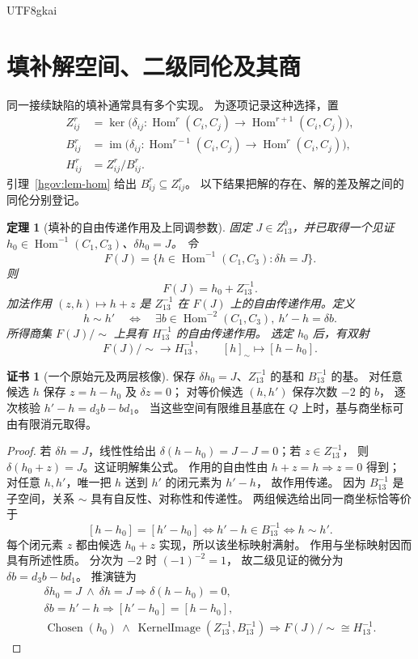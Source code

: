 \documentclass[12pt,a4paper,openany,notitlepage]{report}
\theoremstyle{plain}
\newtheorem{theorem}{定理}[chapter]
\theoremstyle{definition}
\newtheorem*{certificate}{证书}
\theoremstyle{remark}
\def\mathcal#1{#1}\def\mathsf#1{#1}\def\mathbb#1{#1}%
\begin{document}
\begin{CJK*}{UTF8}{gkai}
\section{填补解空间、二级同伦及其商}
\label{exp:hom:fill-space}

同一接续缺陷的填补通常具有多个实现。
为逐项记录这种选择，置
\[
 \begin{aligned}
 Z^r_{ij}
 &=\ker\bigl(\delta_{ij}:
       \operatorname{Hom}^r(C_i,C_j)\to
       \operatorname{Hom}^{r+1}(C_i,C_j)\bigr),\\
 B^r_{ij}
 &=\operatorname{im}\bigl(\delta_{ij}:
       \operatorname{Hom}^{r-1}(C_i,C_j)\to
       \operatorname{Hom}^{r}(C_i,C_j)\bigr),\\
 H^r_{ij}&=Z^r_{ij}/B^r_{ij}.
 \end{aligned}
\]
引理~\ref{hgov:lem-hom} 给出 $B^r_{ij}\subseteq Z^r_{ij}$。
以下结果把解的存在、解的差及解之间的同伦分别登记。

\begin{theorem}[填补的自由传递作用及上同调参数]
\label{exp:hom:filler-torsor}
固定 $J\in Z^0_{13}$，并已取得一个见证
$h_0\in\operatorname{Hom}^{-1}(C_1,C_3)$、$\delta h_0=J$。
令
\[
 \mathcal F(J)
 =\{h\in\operatorname{Hom}^{-1}(C_1,C_3):\delta h=J\}.
\]
则
\[
 \mathcal F(J)=h_0+Z^{-1}_{13}.
\]
加法作用 $(z,h)\mapsto h+z$ 是 $Z^{-1}_{13}$ 在
$\mathcal F(J)$ 上的自由传递作用。定义
\[
 h\sim h'
 \quad\Longleftrightarrow\quad
 \exists b\in\operatorname{Hom}^{-2}(C_1,C_3),\
 h'-h=\delta b.
\]
所得商集 $\mathcal F(J)/{\sim}$ 上具有 $H^{-1}_{13}$ 的自由传递作用。
选定 $h_0$ 后，有双射
\[
 \mathcal F(J)/{\sim}\longrightarrow H^{-1}_{13},
 \qquad [h]_{\sim}\longmapsto[h-h_0].
\]
\end{theorem}
\begin{certificate}[一个原始元及两层核像]
保存 $\delta h_0=J$、$Z^{-1}_{13}$ 的基和
$B^{-1}_{13}$ 的基。
对任意候选 $h$ 保存 $z=h-h_0$ 及 $\delta z=0$；
对等价候选 $(h,h')$ 保存次数 $-2$ 的 $b$，
逐次核验 $h'-h=d_3b-bd_1$。
当这些空间有限维且基底在 $\mathbb Q$ 上时，基与商坐标可由有限消元取得。
\end{certificate}
\begin{proof}
若 $\delta h=J$，线性性给出
$\delta(h-h_0)=J-J=0$；若 $z\in Z^{-1}_{13}$，
则 $\delta(h_0+z)=J$。这证明解集公式。
作用的自由性由 $h+z=h\Rightarrow z=0$ 得到；
对任意 $h,h'$，唯一把 $h$ 送到 $h'$ 的闭元素为 $h'-h$，
故作用传递。
因为 $B^{-1}_{13}$ 是子空间，关系 $\sim$ 具有自反性、对称性和传递性。
两组候选给出同一商坐标恰等价于
\[
 [h-h_0]=[h'-h_0]
 \Longleftrightarrow h'-h\in B^{-1}_{13}
 \Longleftrightarrow h\sim h'.
\]
每个闭元素 $z$ 都由候选 $h_0+z$ 实现，所以该坐标映射满射。
作用与坐标映射因而具有所述性质。
分次为 $-2$ 时 $(-1)^{-2}=1$，
故二级见证的微分为 $\delta b=d_3b-bd_1$。
推演链为
\[
 \begin{gathered}
 \delta h_0=J\ \land\ \delta h=J
 \Rightarrow\delta(h-h_0)=0,\\
 \delta b=h'-h
 \Rightarrow[h'-h_0]=[h-h_0],\\
 \operatorname{Chosen}(h_0)\ \land\
 \operatorname{KernelImage}(Z^{-1}_{13},B^{-1}_{13})
 \Rightarrow
 \mathcal F(J)/{\sim}\cong H^{-1}_{13}.
 \end{gathered}
\]
\end{proof}


\end{CJK*}
\end{document}
